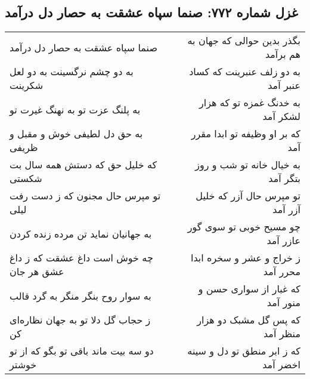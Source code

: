 \begin{center}
\section*{غزل شماره ۷۷۲: صنما سپاه عشقت به حصار دل درآمد}
\label{sec:0772}
\begin{longtable}{l p{0.5cm} r}
صنما سپاه عشقت به حصار دل درآمد
&&
بگذر بدین حوالی که جهان به هم برآمد
\\
به دو چشم نرگسینت به دو لعل شکرینت
&&
به دو زلف عنبرینت که کساد عنبر آمد
\\
به پلنگ عزت تو به نهنگ غیرت تو
&&
به خدنگ غمزه تو که هزار لشکر آمد
\\
به حق دل لطیفی خوش و مقبل و ظریفی
&&
که بر او وظیفه تو ابدا مقرر آمد
\\
که خلیل حق که دستش همه سال بت شکستی
&&
به خیال خانه تو شب و روز بتگر آمد
\\
تو مپرس حال مجنون که ز دست رفت لیلی
&&
تو مپرس حال آزر که خلیل آزر آمد
\\
به جهانیان نماید تن مرده زنده کردن
&&
چو مسیح خوبی تو سوی گور عازر آمد
\\
چه خوش است داغ عشقت که ز داغ عشق هر جان
&&
ز خراج و عشر و سخره ابدا محرر آمد
\\
به سوار روح بنگر منگر به گرد قالب
&&
که غبار از سواری حسن و منور آمد
\\
ز حجاب گل دلا تو به جهان نظاره‌ای کن
&&
که پس گل مشبک دو هزار منظر آمد
\\
دو سه بیت ماند باقی تو بگو که از تو خوشتر
&&
که ز ابر منطق تو دل و سینه اخضر آمد
\\
\end{longtable}
\end{center}
